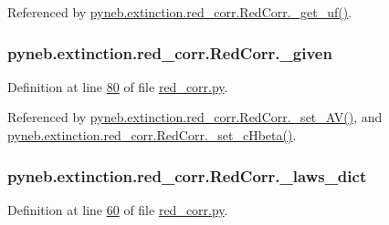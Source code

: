 \begin{DoxyVerb}
Referenced by \hyperlink{red__corr_8py_source_l00156}{pyneb.\+extinction.\+red\+\_\+corr.\+Red\+Corr.\+\_\+get\+\_\+uf()}.

\hypertarget{classpyneb_1_1extinction_1_1red__corr_1_1_red_corr_a99ab4dcd33d50360f4fb61bc80fc90d5}{}
\subsubsection[{\+\_\+given}]{\setlength{\rightskip}{0pt plus 5cm}pyneb.\+extinction.\+red\+\_\+corr.\+Red\+Corr.\+\_\+given\hspace{0.3cm}{\ttfamily [private]}}\label{classpyneb_1_1extinction_1_1red__corr_1_1_red_corr_a99ab4dcd33d50360f4fb61bc80fc90d5}


Definition at line \hyperlink{red__corr_8py_source_l00080}{80} of file \hyperlink{red__corr_8py_source}{red\+\_\+corr.\+py}.



Referenced by \hyperlink{red__corr_8py_source_l00169}{pyneb.\+extinction.\+red\+\_\+corr.\+Red\+Corr.\+\_\+set\+\_\+\+A\+V()}, and \hyperlink{red__corr_8py_source_l00164}{pyneb.\+extinction.\+red\+\_\+corr.\+Red\+Corr.\+\_\+set\+\_\+c\+Hbeta()}.

\hypertarget{classpyneb_1_1extinction_1_1red__corr_1_1_red_corr_a96fbed6f54a26dd2f59fe6441c9c3865}{}
\subsubsection[{\+\_\+laws\+\_\+dict}]{\setlength{\rightskip}{0pt plus 5cm}pyneb.\+extinction.\+red\+\_\+corr.\+Red\+Corr.\+\_\+laws\+\_\+dict\hspace{0.3cm}{\ttfamily [private]}}\label{classpyneb_1_1extinction_1_1red__corr_1_1_red_corr_a96fbed6f54a26dd2f59fe6441c9c3865}


Definition at line \hyperlink{red__corr_8py_source_l00060}{60} of file \hyperlink{red__corr_8py_source}{red\+\_\+corr.\+py}.




\end{DoxyVerb}
